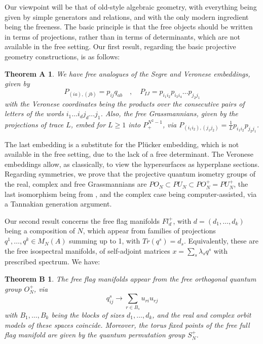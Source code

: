 \documentclass[11pt]{article}
\theoremstyle{plain}
\newtheorem*{theoremA}{Theorem A}
\newtheorem*{theoremB}{Theorem B}
\begin{document}
\bigskip

Our viewpoint will be that of old-style algebraic geometry, with everything being given by simple generators and relations, and with the only modern ingredient being the freeness. The basic principle is that the free objects should be written in terms of projections, rather than in terms of determinants, which are not available in the free setting. Our first result, regarding the basic projective geometry constructions, is as follows:

\begin{theoremA}
We have free analogues of the Segre and Veronese embeddings, given by
$$P_{(ia),(jb)}=p_{ij}q_{ab}\quad,\quad
P_{IJ}=p_{i_1i_2}p_{i_3i_4}\ldots p_{j_2j_1}$$
with the Veronese coordinates being the products over the consecutive pairs of letters of the words $i_1\ldots i_dj_d\ldots j_1$. Also, the free Grassmannians, given by the projections of trace $L$, embed for $L\geq1$ into $P^{N^2-1}_+$, via $P_{(i_1i_2),(j_1j_2)}=\frac{1}{L}p_{i_1i_2}p_{j_2j_1}$.
\end{theoremA}

The last embedding is a substitute for the Pl\"ucker embedding, which is not available in the free setting, due to the lack of a free determinant. The Veronese embeddings allow, as classically, to view the hypersurfaces as hyperplane sections. Regarding symmetries, we prove that the projective quantum isometry groups of the real, complex and free Grassmannians are $PO_N\subset PU_N\subset PO_N^+=PU_N^+$, the last isomorphism being from \cite{bfu}, and the complex case being computer-assisted, via a Tannakian generation argument.

\bigskip

Our second result concerns the free flag manifolds $Fl^+_d$, with $d=(d_1,\ldots,d_k)$ being a composition of $N$, which appear from families of projections $q^1,\ldots,q^k\in M_N(A)$ summing up to 1, with $Tr(q^s)=d_s$. Equivalently, these are the free isospectral manifolds, of self-adjoint matrices $x=\sum_s\lambda_sq^s$ with prescribed spectrum. We have:

\begin{theoremB}
The free flag manifolds appear from the free orthogonal quantum group $O_N^+$, via
$$q^s_{ij}\to\sum_{r\in B_s}u_{ri}u_{rj}$$
with $B_1,\ldots,B_k$ being the blocks of sizes $d_1,\ldots,d_k$, and the real and complex orbit models of these spaces coincide. Moreover, the torus fixed points of the free full flag manifold are given by the quantum permutation group $S_N^+$.
\end{theoremB}
\end{document}
